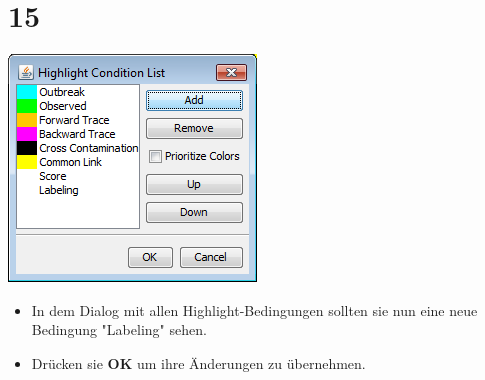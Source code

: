 \documentclass{beamer}
\begin{document}
\section{15}
\begin{frame}
	\begin{center}
  		\includegraphics[height=0.6\textheight]{15.png}
	\end{center}
	\begin{itemize}
		\item In dem Dialog mit allen Highlight-Bedingungen sollten sie nun eine neue Bedingung "Labeling" sehen.
		\item Drücken sie \textbf{OK} um ihre Änderungen zu übernehmen.
	\end{itemize}
\end{frame}
\end{document}
